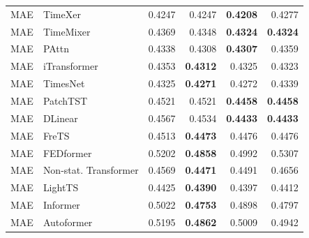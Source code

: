 \begin{longtable}{llrrrr}
\midrule
MAE & TimeXer & 0.4247 & 0.4247 & \textbf{0.4208} & 0.4277 \\
MAE & TimeMixer & 0.4369 & 0.4348 & \textbf{0.4324} & \textbf{0.4324} \\
MAE & PAttn & 0.4338 & 0.4308 & \textbf{0.4307} & 0.4359 \\
MAE & iTransformer & 0.4353 & \textbf{0.4312} & 0.4325 & 0.4323 \\
MAE & TimesNet & 0.4325 & \textbf{0.4271} & 0.4272 & 0.4339 \\
MAE & PatchTST & 0.4521 & 0.4521 & \textbf{0.4458} & \textbf{0.4458} \\
MAE & DLinear & 0.4567 & 0.4534 & \textbf{0.4433} & \textbf{0.4433} \\
MAE & FreTS & 0.4513 & \textbf{0.4473} & 0.4476 & 0.4476 \\
MAE & FEDformer & 0.5202 & \textbf{0.4858} & 0.4992 & 0.5307 \\
MAE & Non-stat. Transformer & 0.4569 & \textbf{0.4471} & 0.4491 & 0.4656 \\
MAE & LightTS & 0.4425 & \textbf{0.4390} & 0.4397 & 0.4412 \\
MAE & Informer & 0.5022 & \textbf{0.4753} & 0.4898 & 0.4797 \\
MAE & Autoformer & 0.5195 & \textbf{0.4862} & 0.5009 & 0.4942 \\
\end{longtable}
\endgroup
